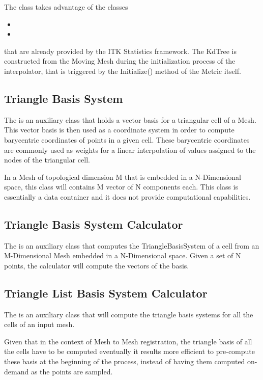 \documentclass{InsightArticle}
\begin{document}
The  class takes advantage of the classes

\begin{itemize}
\item {}
\item {} 
\end{itemize}

that are already provided by the ITK Statistics framework. The KdTree is
constructed from the Moving Mesh during the initialization process of the
interpolator, that is triggered by the Initialize() method of the Metric
itself.

\subsection{Triangle Basis System}

The  is an auxiliary class that holds a vector basis
for a triangular cell of a Mesh. This vector basis is then used as a coordinate
system in order to compute barycentric coordinates of points in a given cell.
These barycentric coordinates are commonly used as weights for a linear
interpolation of values assigned to the nodes of the triangular cell.

In a Mesh of topological dimension M that is embedded in a N-Dimensional space,
this class will contains M vector of N components each. This class is
essentially a data container and it does not provide computational
capabilities.

\subsection{Triangle Basis System Calculator}

The  is an auxiliary class that computes
the TriangleBasisSystem of a cell from an M-Dimensional Mesh embedded in a
N-Dimensional space.  Given a set of N points, the calculator will compute the
vectors of the basis.

\subsection{Triangle List Basis System Calculator}

The  is an auxiliary class that will
compute the triangle basis systems for all the cells of an input mesh.

Given that in the context of Mesh to Mesh registration, the triangle basis of
all the cells have to be computed eventually it results more efficient to
pre-compute these basis at the beginning of the process, instead of having them
computed on-demand as the points are sampled.
\end{document}
